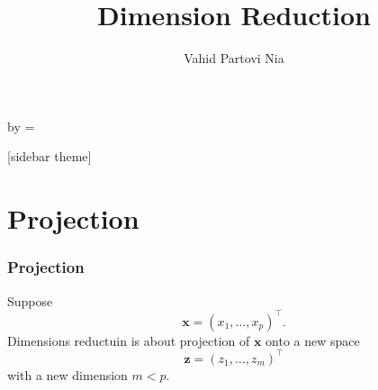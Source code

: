 

\usepackage{listings}
\usepackage{xcolor}
\def \y {\mathbf y}
\def \z {\mathbf z}
\def \Z {\mathbf Z}
\def \X {\mathbf X}
\def \A {\mathbf A}
\def \t {^\top}
\def \inv {^ {-1}}
\def \x {\mathbf x}
\def \bbeta {\boldsymbol \beta}
\def \eeps {\boldsymbol \varepsilon}
\def \TV {\mathrm{TV}}
\def \Radio {\mathrm{Radio}}
\def \Newspaper {\mathrm{Newspaper}}
\def \Sales {\mathrm{Sales}}
\def \Balance {\mathrm{Balance}}
\def \Default {\mathrm{Default}}
\def \M {\mathcal{M}}

\def \r {\mathbf{r}}
\def \e {\mathbf{e}}

\def \RSS {\mathrm{RSS}}

\def \E {\mathrm{E}}
\def \P {\mathbf{P}}

\def \V {\mathrm{V}}
\def \cor {\mathrm{cor}}

\def \SSigma {\boldsymbol{\Sigma}}
\def \LLambda {\boldsymbol{\Lambda}}
\def \pphi {\boldsymbol{\phi}}
\def \PPhi {\boldsymbol{\Phi}}
\def \mmu {\boldsymbol{\mu}}
\def \ttheta {\boldsymbol{\theta}}



\title[]{Dimension Reduction}   
\author[]{Vahid Partovi Nia} 
\date{}


\makeatletter
  \begin{frame}[plain]
    \hspace*{-\beamer@leftsidebar}%
    \advance\textwidth by \beamer@leftsidebar\relax
    \beamer@leftsidebar=\z@
    \begin{minipage}{\textwidth}\par%
      \maketitle
    \end{minipage}
  \end{frame}
  \makeatother




[sidebar theme]

\section{Projection}
\begin{frame}[fragile]\frametitle{Projection}
Suppose $$\x = (x_1, \ldots, x_p)\t.$$ 
Dimensions reductuin is about projection of $\x$ onto a new space  $$\z=(z_1,\ldots,z_m)\t$$ with a new dimension $m<p$.
\end{frame}

